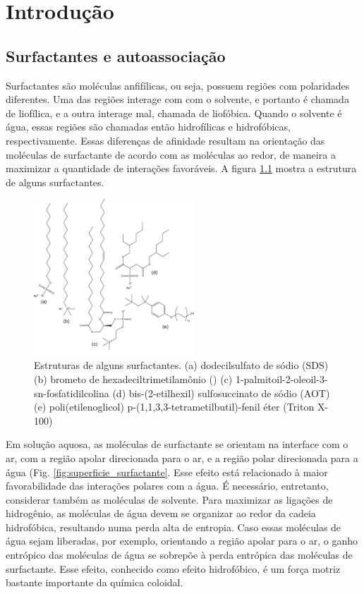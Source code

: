 
\part{Introdução}
	\chapter{Surfactantes e autoassociação}
	
	Surfactantes são moléculas anfifílicas, ou seja, possuem regiões com polaridades diferentes. Uma das regiões interage com com o solvente, e portanto é chamada de liofílica, e a outra interage mal, chamada de liofóbica. Quando o solvente é água, essas regiões são chamadas então hidrofílicas e hidrofóbicas, respectivamente. Essas diferenças de afinidade resultam na orientação das moléculas de surfactante de acordo com as moléculas ao redor, de maneira a maximizar a quantidade de interações favoráveis. A figura \ref{fig:estrutura_surfactantes} mostra a estrutura de alguns surfactantes.
	
	\begin{figure}[H]  %
		\centering
		\includegraphics[width=6cm]{./imagens/introducao/estrutura_surfactantes}
		\caption{Estruturas de alguns surfactantes. (a) dodecilsulfato de sódio (SDS) (b) brometo de hexadeciltrimetilamônio (\CTAB) (c) 1-palmitoil-2-oleoil-3-sn-fosfatidilcolina (d) bis-(2-etilhexil) sulfosuccinato de sódio (AOT) (e) poli(etilenoglicol) p-(1,1,3,3-tetrametilbutil)-fenil éter (Triton X-100)}
		\label{fig:estrutura_surfactantes}
	\end{figure}
	
	Em solução aquosa, as moléculas de surfactante se orientam na interface com o ar, com a região apolar direcionada para o ar, e a região polar direcionada para a água (Fig. \ref{fig:superficie_surfactante}. Esse efeito está relacionado à maior favorabilidade das interações polares com a água. É necessário, entretanto, considerar também as moléculas de solvente. Para maximizar as ligações de hidrogênio, as moléculas de água devem se organizar ao redor da cadeia hidrofóbica, resultando numa perda alta de entropia. Caso essas moléculas de água sejam liberadas, por exemplo, orientando a região apolar para o ar, o ganho entrópico das moléculas de água se sobrepõe à perda entrópica das moléculas de surfactante. Esse efeito, conhecido como efeito hidrofóbico, é um força motriz bastante importante da química coloidal.
	
